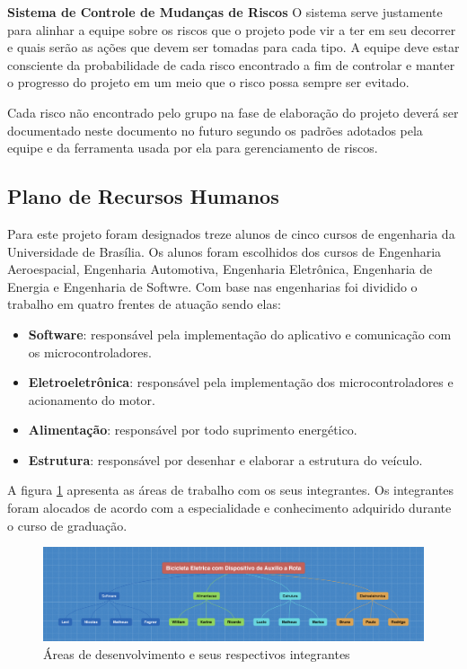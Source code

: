 		\textbf{Sistema de Controle de Mudanças de Riscos}
		O sistema serve justamente para alinhar a equipe sobre os riscos que o projeto pode vir a ter em seu decorrer e quais serão as ações que devem ser tomadas para cada tipo. A equipe deve estar consciente da probabilidade de cada risco encontrado a fim de controlar e manter o progresso do projeto em um meio que o risco possa sempre ser evitado.
		
		Cada risco não encontrado pelo grupo na fase de elaboração do projeto deverá ser documentado neste documento no futuro segundo os padrões adotados pela equipe e da ferramenta usada por ela para gerenciamento de riscos.

    \subsection{Plano de Recursos Humanos}
	Para este projeto foram designados treze alunos de cinco cursos de engenharia da Universidade de Brasília. Os alunos foram escolhidos dos cursos de Engenharia Aeroespacial, Engenharia Automotiva, Engenharia Eletrônica, Engenharia de Energia e Engenharia de Softwre. Com base nas engenharias foi dividido o trabalho em quatro frentes de atuação sendo elas:
	\begin{itemize}
		\item \textbf{Software}: responsável pela implementação do aplicativo e comunicação com os microcontroladores.
		\item \textbf{Eletroeletrônica}: responsável pela implementação dos microcontroladores e acionamento do motor.
		\item \textbf{Alimentação}: responsável por todo suprimento energético.
		\item \textbf{Estrutura}: responsável por desenhar e elaborar a estrutura do veículo.
	\end{itemize}
	
	A figura \ref{img:projeto} apresenta as áreas de trabalho com os seus integrantes. Os integrantes foram alocados de acordo com a especialidade e conhecimento adquirido durante o curso de graduação.
	
	\graphicspath{{figuras/}}
	\begin{figure}[h!]
	\centering
	\includegraphics[scale=0.20]{project.png}
	\caption{Áreas de desenvolvimento e seus respectivos integrantes}
	\label{img:projeto}
	\end{figure}



